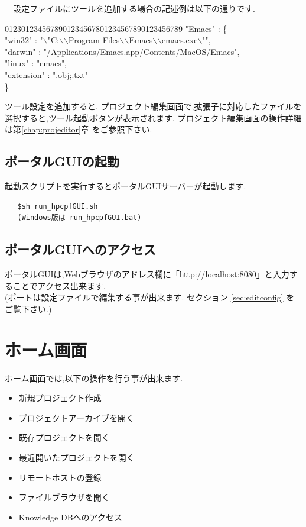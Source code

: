 \documentclass[a4paper,10pt,oneside]{jsbook}
\begin{document}
\  \ 設定ファイルにツールを追加する場合の記述例は以下の通りです.
\begin{tabbing}
0123\=0123456789012345678\=0123456789\=0123456789\kill
\> "Emacs" : \{ \\
\> \> "win32"    : "$\backslash$"C:$\backslash$$\backslash$Program Files$\backslash$$\backslash$Emacs$\backslash$$\backslash$emacs.exe$\backslash$"",\\
\> \> "darwin" : "/Applications/Emacs.app/Contents/MacOS/Emacs",\\
\> \> "linux"  : "emacs",\\
\> \> "extension" : ".obj;.txt"\\
\> \}\\
\end{tabbing}

ツール設定を追加すると, プロジェクト編集画面で,拡張子に対応したファイルを選択すると,ツール起動ボタンが表示されます. プロジェクト編集画面の操作詳細は第\ref{chap:projeditor}章 をご参照下さい.

\newpage
\section{ポータルGUIの起動}
起動スクリプトを実行するとポータルGUIサーバーが起動します.
\begin{verbatim}
   $sh run_hpcpfGUI.sh
   (Windows版は run_hpcpfGUI.bat)
\end{verbatim}

\section{ポータルGUIへのアクセス}
ポータルGUIは,Webブラウザのアドレス欄に「http://localhost:8080」と入力することでアクセス出来ます.\\
(ポートは設定ファイルで編集する事が出来ます. セクション \ref{sec:editconfig} をご覧下さい.)

\chapter{ホーム画面}
ホーム画面では,以下の操作を行う事が出来ます.
\begin{itemize}
	\item 新規プロジェクト作成
	\item プロジェクトアーカイブを開く
	\item 既存プロジェクトを開く
	\item 最近開いたプロジェクトを開く
	\item リモートホストの登録
	\item ファイルブラウザを開く
	\item Knowledge DBへのアクセス
\end{itemize}
\end{document}
